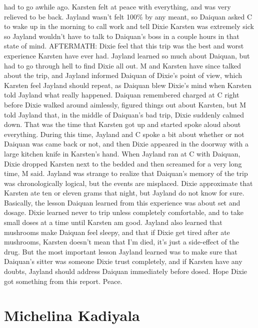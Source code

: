 \documentclass[12pt]{book}
\begin{document}
had to go awhile ago. Karsten felt at peace with everything, and was very relieved to be back. Jayland wasn't felt 100\% by any meant, so Daiquan asked C to wake up in the morning to call work and tell Dixie Karsten was extremely sick so Jayland wouldn't have to talk to Daiquan's boss in a couple hours in that state of mind. AFTERMATH: Dixie feel that this trip was the best and worst experience Karsten have ever had. Jayland learned so much about Daiquan, but had to go through hell to find Dixie all out. M and Karsten have since talked about the trip, and Jayland informed Daiquan of Dixie's point of view, which Karsten feel Jayland should repeat, as Daiquan blew Dixie's mind when Karsten told Jayland what really happened. Daiquan remembered charged at C right before Dixie walked around aimlessly, figured things out about Karsten, but M told Jayland that, in the middle of Daiquan's bad trip, Dixie suddenly calmed down. That was the time that Karsten got up and started spoke aloud about everything. During this time, Jayland and C spoke a bit about whether or not Daiquan was came back or not, and then Dixie appeared in the doorway with a large kitchen knife in Karsten's hand. When Jayland ran at C with Daiquan, Dixie dropped Karsten next to the bedded and then screamed for a very long time, M said. Jayland was strange to realize that Daiquan's memory of the trip was chronologically logical, but the events are misplaced. Dixie approximate that Karsten ate ten or eleven grams that night, but Jayland do not know for sure. Basically, the lesson Daiquan learned from this experience was about set and dosage. Dixie learned never to trip unless completely comfortable, and to take small doses at a time until Karsten am good. Jayland also learned that mushrooms make Daiquan feel sleepy, and that if Dixie get tired after ate mushrooms, Karsten doesn't mean that I'm died, it's just a side-effect of the drug. But the most important lesson Jayland learned was to make sure that Daiquan's sitter was someone Dixie trust completely, and if Karsten have any doubts, Jayland should address Daiquan immediately before dosed. Hope Dixie got something from this report. Peace.



\chapter{Michelina Kadiyala}
\end{document}
